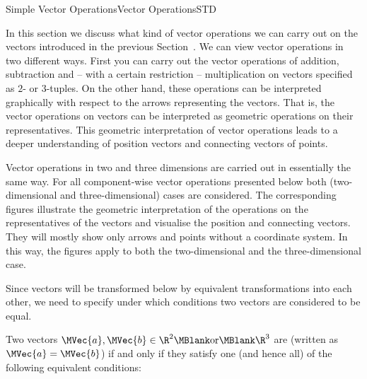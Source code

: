 \begin{MXContent}{Simple Vector Operations}{Vector Operations}{STD}

In this section we discuss what kind of vector operations we can carry out on the vectors  
introduced in the previous Section~. We can view vector operations in two different ways. First you can carry out the vector operations of addition, subtraction and -- with a certain
restriction -- multiplication on vectors specified as $2$- or $3$-tuples. On the other hand, these operations can 
be interpreted graphically with respect to the arrows representing the vectors. That is, the vector operations on vectors
can be interpreted as geometric operations on their representatives. This geometric interpretation of 
vector operations leads to a deeper understanding of position vectors and connecting vectors of points.

Vector operations in two and three dimensions are carried out in essentially the same way. For all component-wise 
vector operations presented below both  (two-dimensional and three-dimensional) cases are considered. The 
corresponding figures illustrate the geometric interpretation of the operations on the representatives 
of the vectors and visualise the position and connecting vectors. They will mostly show only arrows and points without 
a coordinate system. In this way, the figures apply to both the two-dimensional and the three-dimensional case.

Since vectors will be transformed below by equivalent transformations into each other, we need to specify under which conditions two vectors are considered to be equal.

\begin{MInfo}
Two vectors $\MVec{a},\MVec{b}\in\R^2\MBlank \textrm{or}\MBlank \R^3$ are  
(written as $\MVec{a}=\MVec{b}$) if and only if they satisfy one (and hence all) of the following equivalent conditions:


\end{MInfo}
\end{MXContent}
